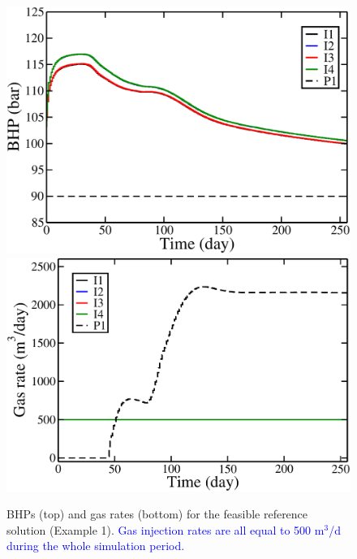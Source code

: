 \documentclass[twocolumn,numbook]{svjour3}          %
\newcommand{\blue}[1]{\textcolor{blue}{#1}}
\begin{document}
\begin{figure}
\begin{center}
\includegraphics[totalheight=2.2in,angle=0]{ReferenceC500HeuristicItPb_BHP.pdf}
\includegraphics[totalheight=2.17in,angle=0]{ReferenceC500HeuristicItPb_rate_gas.pdf}
\end{center}
\caption{BHPs (top) and gas rates (bottom) for the feasible reference solution (Example 1). 
  \blue{Gas injection rates are all equal to 500 m$^3$/d during the whole simulation period.} }
\label{fig:PIReferencePlots}
\end{figure}




\end{document}
